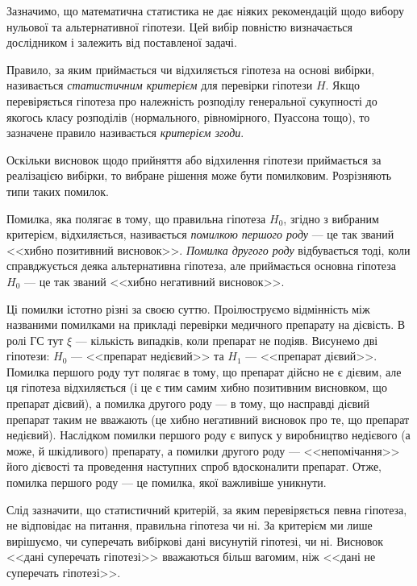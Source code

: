 Зазначимо, що математична статистика не дає ніяких рекомендацій
щодо вибору нульової та альтернативної гіпотези. Цей вибір повністю 
визначається дослідником і залежить від поставленої задачі.
\begin{definition}
    Правило, за яким приймається чи відхиляється гіпотеза на 
    основі вибірки, називається \emph{статистичним критерієм} для перевірки 
    гіпотези $H$. Якщо перевіряється гіпотеза про належність розподілу 
    генеральної сукупності до якогось класу розподілів (нормального, 
    рівномірного, Пуассона тощо), то зазначене правило називається \emph{критерієм згоди}.
\end{definition}
Оскільки висновок щодо прийняття або відхилення гіпотези 
приймається за реалізацією вибірки, то вибране рішення може бути 
помилковим. Розрізняють типи таких помилок.

\begin{definition}
    Помилка, яка полягає в тому, що правильна гіпотеза $H_0$, 
    згідно з вибраним критерієм, відхиляється, називається \emph{помилкою першого роду} --- це так званий <<хибно позитивний висновок>>. 
    \emph{Помилка другого роду} відбувається тоді, коли справджується 
    деяка альтернативна гіпотеза, але приймається основна гіпотеза $H_0$ --- це так званий <<хибно негативний висновок>>.
\end{definition}
Ці помилки істотно різні за своєю суттю. Проілюструємо відмінність 
між названими помилками на прикладі перевірки медичного препарату на дієвість.
В ролі ГС тут $\xi$ --- кількість випадків, коли препарат не подіяв. Висунемо дві гіпотези:
$H_0$ --- <<препарат недієвий>> та $H_1$ --- <<препарат дієвий>>. Помилка першого роду тут полягає в тому, що препарат дійсно не є дієвим,
але ця гіпотеза відхиляється (і це є тим самим хибно позитивним висновком, що препарат дієвий), 
а помилка другого роду --- в тому, що насправді дієвий препарат таким не вважають (це хибно негативний висновок про те, що препарат недієвий).
Наслідком помилки першого роду є випуск у виробництво недієвого (а може, й шкідливого) препарату, а помилки другого роду --- <<непомічання>> 
його дієвості та проведення наступних спроб вдосконалити препарат. Отже, помилка першого роду –-- це помилка, якої важливіше 
уникнути.

Слід зазначити, що статистичний критерій, за яким перевіряється певна 
гіпотеза, не відповідає на питання, правильна гіпотеза чи ні. За критерієм ми 
лише вирішуємо, чи суперечать вибіркові дані висунутій гіпотезі, чи ні. Висновок <<дані 
суперечать гіпотезі>> вважаються більш вагомим, ніж <<дані не суперечать гіпотезі>>.

